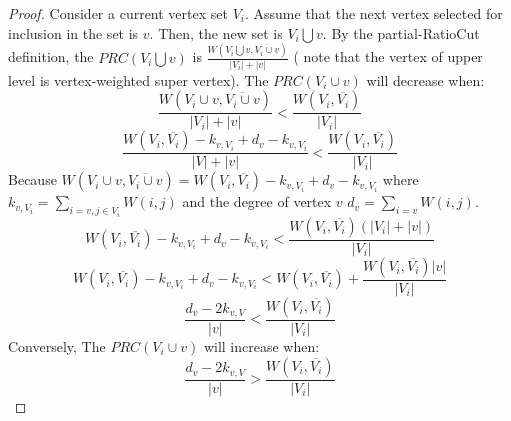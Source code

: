\documentclass{acm_proc_article-sp}
\begin{document}
\begin{proof}
 Consider a current vertex set $V_{i}$. Assume that the next vertex selected for inclusion in the set is $v$. Then, the new set is $V_{i}\bigcup{v}$. By the partial-RatioCut definition, the $PRC(V_{i}\bigcup{v})$ is $\frac{W(V_{i}\bigcup{v},\overline{V_{i}\cup{v}})}{|V_{i}|+|v|}$ ( note that the vertex of upper level is vertex-weighted super vertex). The $PRC(V_{i}\cup{v})$ will decrease when:
 \begin{displaymath}
\frac{W(V_{i}\cup{v},\overline{V_{i}\cup {v}})}{|V_{i}|+|v|}< \frac{W(V_{i},\overline{V_{i}})}{|V_{i}|}
\end{displaymath}
 \begin{displaymath}
\frac{W(V_{i},\overline{V_{i}})-k_{v,V_{i}}+d_{v}-k_{v,V_{i}}}{|V|+|v|}< \frac{W(V_{i},\overline{V_{i}})}{|V_{i}|}
\end{displaymath}
Because $W(V_{i}\cup{v},\overline{V_{i}\cup{v}})=W(V_{i},\overline {V_{i}})-k_{v,V_{i}}+d_{v}-k_{v,V_{i}}$ where $k_{v,V_{i}}=\sum_{i=v,j\in V_{i}}W(i,j)$ and the degree of vertex $v$ $d_{v}=\sum_{i=v}W(i,j)$.
 \begin{displaymath}
W(V_{i},\overline {V_{i}})-k_{v,V_{i}}+d_{v}-k_{v,V_{i}}<\frac{W(V_{i},\overline{V_{i}})(|V_{i}|+|v|)}{|V_{i}|}
\end{displaymath}
 \begin{displaymath}
W(V_{i},\overline {V_{i}})-k_{v,V_{i}}+d_{v}-k_{v,V_{i}}<W(V_{i},\overline{V_{i}})+\frac{W(V_{i},\overline{V_{i}})|v|}{|V_{i}|}
\end{displaymath}
 \begin{displaymath}
\frac {d_{v}-2k_{v,V}}{|v|} <\frac{W(V_{i},\overline{V_{i}})}{|V_{i}|}
\end{displaymath}
Conversely, The $PRC(V_{i}\cup{v})$ will increase when:
 \begin{displaymath}
\frac {d_{v}-2k_{v,V}}{|v|}>\frac{W(V_{i},\overline{V_{i}})}{|V_{i}|}
\end{displaymath}
\end{proof}
\end{document}
